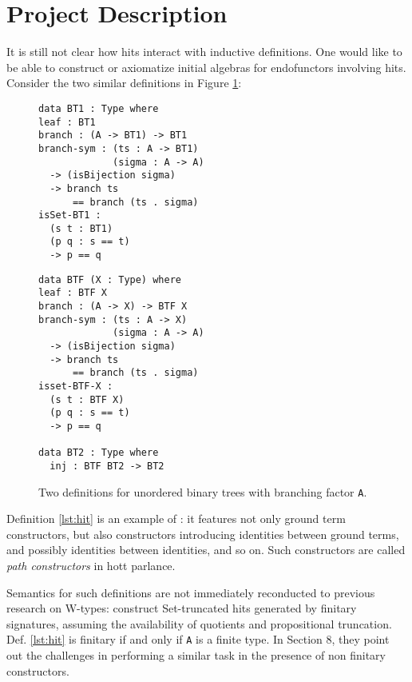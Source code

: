 \documentclass[a4paper]{article}
\begin{document}
\section{Project Description}

It is still not clear how \glspl{hit} interact with inductive definitions. One would like to be able to construct or axiomatize initial algebras for endofunctors involving \glspl{hit}. Consider the two similar definitions in Figure \ref{fig:trdefs}:

\bgroup
\renewcommand{\lstlistingname}{Definition}
\begin{figure}
	\caption{Two definitions for unordered binary trees with branching factor \texttt{A}.}
	\label{fig:trdefs}
	\centering
	\begin{minipage}{.45\textwidth}
		\begin{lstlisting}[caption={\gls{hit} based},label={lst:hit}]
data BT1 : Type where
leaf : BT1
branch : (A -> BT1) -> BT1
branch-sym : (ts : A -> BT1)
             (sigma : A -> A)
  -> (isBijection sigma)
  -> branch ts 
      == branch (ts . sigma)
isSet-BT1 :
  (s t : BT1)
  (p q : s == t)
  -> p == q
\end{lstlisting}
	\end{minipage}
	\qquad
	\begin{minipage}{.45\textwidth}
		\begin{lstlisting}[caption={Initial algebra based},label={lst:fix}]
data BTF (X : Type) where
leaf : BTF X
branch : (A -> X) -> BTF X
branch-sym : (ts : A -> X)
             (sigma : A -> A)
  -> (isBijection sigma)
  -> branch ts 
      == branch (ts . sigma)
isset-BTF-X :
  (s t : BTF X)
  (p q : s == t)
  -> p == q

data BT2 : Type where
  inj : BTF BT2 -> BT2
\end{lstlisting}
	\end{minipage}
\end{figure}
\egroup

Definition \ref{lst:hit} is an example of : it features not only ground term constructors, but also constructors introducing identities between ground terms, and possibly identities between identities, and so on. Such constructors are called \textit{path constructors} in \gls{hott} parlance.

Semantics for such definitions are not immediately reconducted to previous research on W-types: \textcite{Weide2019} construct Set-truncated \glspl{hit} generated by finitary signatures, assuming the availability of quotients and propositional truncation. Def. \ref{lst:hit} is finitary if and only if \texttt{A} is a finite type. In Section 8, they point out the challenges in performing a similar task in the presence of non finitary constructors.
\end{document}

